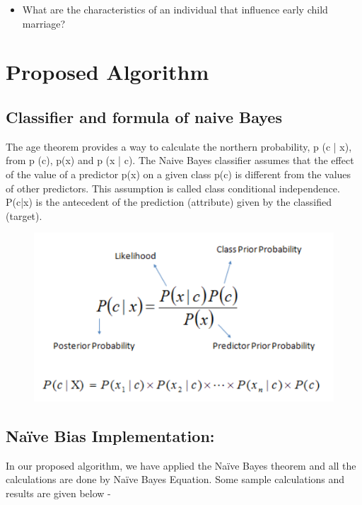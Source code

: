\documentclass{article}
\begin{document}
    \begin{itemize}
        \item What are the characteristics of an individual that influence early child marriage?
    \end{itemize}
    

\section{Proposed Algorithm}


        \subsection{Classifier and formula of naive Bayes}
        The age theorem provides a way to calculate the northern probability, p (c | x), from p (c), p(x) and p (x | c). The Naive Bayes classifier assumes that the effect of the value of a predictor p(x) on a given class p(c) is different from the values of other predictors. This assumption is called class conditional independence. P(c|x) is the antecedent of the prediction (attribute) given by the classified (target). 
        \begin{figure}[!htb]
            \includegraphics[width=1\textwidth]{Images/naive.png}
        \end{figure} 
        \pagebreak\subsection{Naïve Bias Implementation: }
        In our proposed algorithm, we have applied the Naïve Bayes theorem and all the calculations are done by Naïve Bayes Equation. Some sample calculations and results are given below - 
\end{document}
